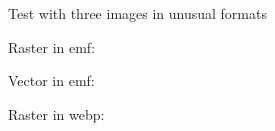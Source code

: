 \documentclass[11pt,a4paper]{article}
\begin{document}
Test with three images in unusual formats

Raster in emf:

\begin{figure}[h]
\end{figure}

Vector in emf:

\begin{figure}[h]
\end{figure}

Raster in webp:

\begin{figure}[h]
\end{figure}
\end{document}
